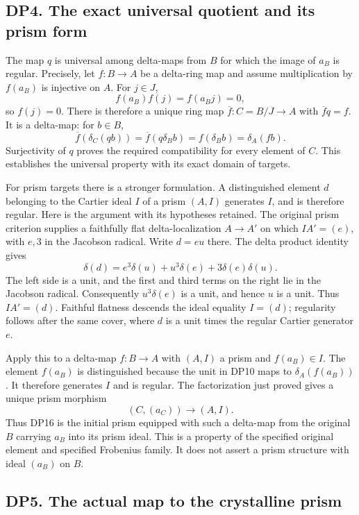 \documentclass[
  10pt,
  a4paper,
]{article}
\begin{document}
\subsection{DP4. The exact universal quotient and its prism
form}\label{dp4.-the-exact-universal-quotient-and-its-prism-form}

The map \(q\) is universal among delta-maps from \(B\) for which the
image of \(a_B\) is regular. Precisely, let \(f:B\to A\) be a delta-ring
map and assume multiplication by \(f(a_B)\) is injective on \(A\). For
\(j\in J\), \[
f(a_B)f(j)=f(a_Bj)=0,
\] so \(f(j)=0\). There is therefore a unique ring map
\(\overline f:C=B/J\to A\) with \(\overline f q=f\). It is a delta-map:
for \(b\in B\), \[
\overline f(\delta_C(qb))
=\overline f(q\delta_Bb)
=f(\delta_Bb)
=\delta_A(fb).
\] Surjectivity of \(q\) proves the required compatibility for every
element of \(C\). This establishes the universal property with its exact
domain of targets.

For prism targets there is a stronger formulation. A distinguished
element \(d\) belonging to the Cartier ideal \(I\) of a prism \((A,I)\)
generates \(I\), and is therefore regular. Here is the argument with its
hypotheses retained. The original prism criterion supplies a faithfully
flat delta-localization \(A\to A'\) on which \(IA'=(e)\), with \(e,3\)
in the Jacobson radical. Write \(d=eu\) there. The delta product
identity gives \[
\delta(d)=e^3\delta(u)+u^3\delta(e)+3\delta(e)\delta(u).
\] The left side is a unit, and the first and third terms on the right
lie in the Jacobson radical. Consequently \(u^3\delta(e)\) is a unit,
and hence \(u\) is a unit. Thus \(IA'=(d)\). Faithful flatness descends
the ideal equality \(I=(d)\); regularity follows after the same cover,
where \(d\) is a unit times the regular Cartier generator \(e\).

Apply this to a delta-map \(f:B\to A\) with \((A,I)\) a prism and
\(f(a_B)\in I\). The element \(f(a_B)\) is distinguished because the
unit in DP10 maps to \(\delta_A(f(a_B))\). It therefore generates \(I\)
and is regular. The factorization just proved gives a unique prism
morphism \[
(C,(a_C))\longrightarrow(A,I).
\tag{DP17}
\] Thus DP16 is the initial prism equipped with such a delta-map from
the original \(B\) carrying \(a_B\) into its prism ideal. This is a
property of the specified original element and specified Frobenius
family. It does not assert a prism structure with ideal \((a_B)\) on
\(B\).

\subsection{DP5. The actual map to the crystalline
prism}\label{dp5.-the-actual-map-to-the-crystalline-prism}
\end{document}
